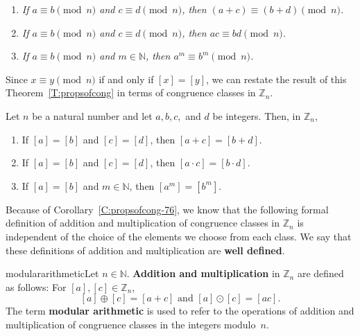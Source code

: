 \begin{enumerate}
  \item \emph{If  $a \equiv b \pmod n$ and  $c \equiv d \pmod n$, then  $\left( {a + c} \right) \equiv \left( {b + d} \right) \pmod n$.}  

  \item \emph{If  $a \equiv b \pmod n$ and  $c \equiv d \pmod n$, then  
$ac \equiv bd \pmod n$.}  

 \item \emph{If  $a \equiv b \pmod n$ and  $m \in \mathbb{N}$, then  
$a^m \equiv b^m \pmod n$.}
\end{enumerate}

\noindent
Since  $x \equiv y \pmod n$ if and only if  
$[ x ] = [ y ]$, we can restate the result of this Theorem~\ref{T:propsofcong} in terms of congruence classes in  $\mathbb{Z}_n $.

\begin{corollary}\label{C:propsofcong-76}
Let  $n$  be a natural number and let $a, b, c,$ and $d$ be integers. Then, in  $\mathbb{Z}_n $,
\begin{enumerate}
\item If  $[ a ] = [ b ]$ and  $[ c ] = [ d ]$, then              $[ {a + c} ] = [ {b + d} ]$.

\item If  $[ a ] = [ b ]$ and  $[ c ] = [ d ]$, then              $[ {a \cdot c} ] = [ {b \cdot d} ]$.

\item If  $[ a ] = [ b ]$ and $m \in \mathbb{N}$, then
      $[ a ^m] = [ b ^m]$.
\end{enumerate}
\end{corollary}
\hbreak
%
Because of Corollary~\ref{C:propsofcong-76}, we know that the following formal definition of addition and multiplication of congruence classes in  $\mathbb{Z}_{n} $  is independent of the choice of the elements we choose from each class.  We say that these definitions of addition and multiplication are \textbf{well defined}.

\begin{defbox}{modulararithmetic}{Let  $n \in \mathbb{N}$.  \textbf{Addition and multiplication}
%
%
 in  $\mathbb{Z}_n $ are defined as follows:  For  $[ a ], [ c ] \in \mathbb{Z}_n $, \label{sym:addmodn}
\[
[ a ] \oplus [ c ] = [ {a + c} ] \text{  and  }[ a ] \odot [ c ] = [ {ac} ].
\]
The term \textbf{modular arithmetic}
%
 is used to refer to the operations of addition and multiplication of congruence classes in the integers modulo~$n$.}
\end{defbox}

